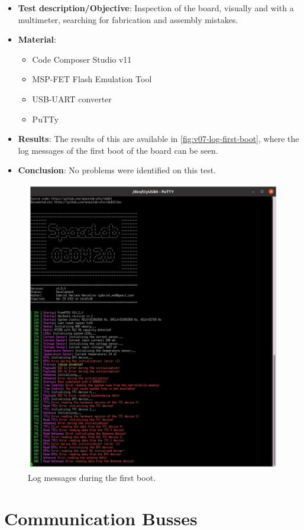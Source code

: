 \begin{itemize}
    \item \textbf{Test description/Objective}: Inspection of the board, visually and with a multimeter, searching for fabrication and assembly mistakes.
    \item \textbf{Material}:
        \begin{itemize}
            \item Code Composer Studio v11
            \item MSP-FET Flash Emulation Tool
            \item USB-UART converter
            \item PuTTy
        \end{itemize}
    \item \textbf{Results}: The results of this are available in \autoref{fig:v07-log-first-boot}, where the log messages of the first boot of the board can be seen.
    \item \textbf{Conclusion}: No problems were identified on this test.
\end{itemize}

\begin{figure}[!ht]
    \begin{center}
        \includegraphics[width=0.7\columnwidth]{figures/v07/obdh2-boot.png}
        \caption{Log messages during the first boot.}
        \label{fig:v07-log-first-boot}
    \end{center}
\end{figure}

\section{Communication Busses}

